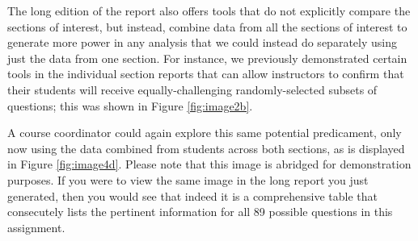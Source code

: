 \documentclass[11pt,a4paper,oldfontcommands,openany]{memoir}
\numberwithin{equation}{section} %
\begin{document}
The long edition of the report also offers tools that do not explicitly compare the sections of interest, but instead, combine data from all the sections of interest to generate more power in any analysis that we could instead do separately using just the data from one section. For instance, we previously demonstrated certain tools in the individual section reports that can allow instructors to confirm that their students will receive equally-challenging randomly-selected subsets of questions; this was shown in Figure \ref{fig:image2b}.

A course coordinator could again explore this same potential predicament, only now using the data combined from students across both sections, as is displayed in Figure \ref{fig:image4d}. Please note that this image is abridged for demonstration purposes. If you were to view the same image in the long report you just generated, then you would see that indeed it is a comprehensive table that consecutely lists the pertinent information for all 89 possible questions in this assignment.

\begin{center}
\captionsetup{width=\textwidth}
\label{fig:image4d}
\end{center}
\end{document}
